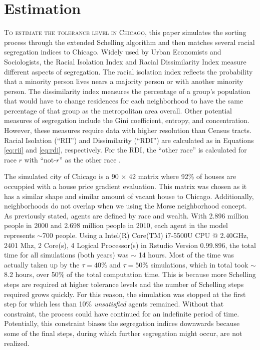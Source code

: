 \begin{savequote}[75mm]
\end{savequote}

\chapter{Estimation}
{\lettrine[lines=3,slope=1pt,nindent=1pt,]{\textcolor{SchoolColor}{T}}{o estimate the tolerance level in Chicago}, this paper simulates the sorting process through the extended Schelling algorithm and then matches several racial segregation indices to Chicago. Widely used by Urban Economists and Sociologists, the Racial Isolation Index and Racial Dissimilarity Index measure different aspects of segregation. The racial isolation index reflects the probability that a minority person lives nears a majority person or with another minority person. The dissimilarity index measures the percentage of a group's population that would have to change residences for each neighborhood to have the same percentage of that group as the metropolitan area overall. Other potential measures of segregation include the Gini coefficient, entropy, and concentration. However, these measures require data with higher resolution than Census tracts. Racial Isolation (``RII'') and Dissimilarity (``RDI'') are calculated as in Equations \ref{eq:rii} and \ref{eq:rdi}, respectively. For the RDI, the ``other race'' is calculated for race $r$ with ``not-$r$'' as the other race \cite{cutler99}.

The simulated city of Chicago is a 90 $\times$ 42 matrix where 92\% of houses are occuppied with a house price gradient evaluation. This matrix was chosen as it has a similar shape and similar amount of vacant house to Chicago. Additionally, neighborhoods do not overlap when we using the Morse neighborhood concept. As previously stated, agents are defined by race and wealth. With 2.896 million people in 2000 and 2.698 million people in 2010, each agent in the model represents $\sim$700 people. Using a Intel(R) Core(TM) i7-5500U CPU @ 2.40GHz, 2401 Mhz, 2 Core(s), 4 Logical Processor(s) in Rstudio Version 0.99.896, the total time for all simulations (both years) was $\sim$ 14 hours. Most of the time was actually taken up by the $\tau = 40\%$ and  $\tau = 50\%$ simulations, which in total took $\sim$ 8.2 hours, over 50\% of the total computation time. This is because more Schelling steps are required at higher tolerance levels and the number of Schelling steps required grows quickly. For this reason, the simulation was stopped at the first step for which less than 10\% \textit{unsatisfied} agents remained. Without that constraint, the process could have continued for an indefinite period of time. Potentially, this constraint biases the segregation indices downwards because some of the final steps, during which further segregation might occur, are not realized. 

}
